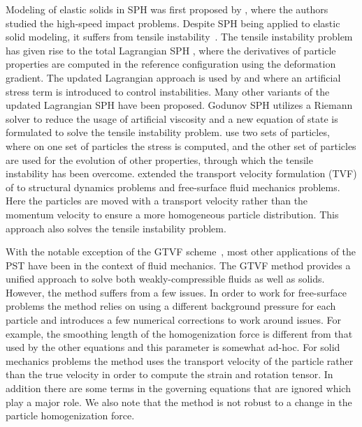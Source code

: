 Modeling of elastic solids in SPH was first proposed by
\textcite{libersky1991smooth}, where the authors studied the high-speed impact
problems. Despite SPH being applied to elastic solid modeling, it suffers from
tensile instability~\parencite{swegle1995smoothed}. The tensile instability problem
has given rise to the total Lagrangian SPH \parencite{belytschko2000unified,
  bonet2002alternative, vignjevic2006sph}, where the derivatives of particle
properties are computed in the reference configuration using the deformation
gradient. The updated Lagrangian approach is used by \textcite{gray2001sph} and
\textcite{monaghan2000sph} where an artificial stress term is introduced to control
instabilities. Many other variants of the updated Lagrangian SPH have been
proposed. Godunov SPH \parencite{sugiura2017extension} utilizes a Riemann solver to
reduce the usage of artificial viscosity and a new equation of state is
formulated to solve the tensile instability problem. \textcite{dyka1995approach} use
two sets of particles, where on one set of particles the stress is computed, and
the other set of particles are used for the evolution of other properties,
through which the tensile instability has been overcome.
\textcite{zhang2017generalized} extended the transport velocity formulation (TVF) of
\textcite{adami2013transport} to structural dynamics problems and free-surface fluid
mechanics problems. Here the particles are moved with a transport velocity
rather than the momentum velocity to ensure a more homogeneous particle
distribution. This approach also solves the tensile instability problem.

With the notable exception of the GTVF scheme~\parencite{zhang_hu_adams17}, most
other applications of the PST have been in the context of fluid mechanics. The
GTVF method provides a unified approach to solve both weakly-compressible fluids
as well as solids. However, the method suffers from a few issues. In order to
work for free-surface problems the method relies on using a different background
pressure for each particle and introduces a few numerical corrections to work
around issues. For example, the smoothing length of the homogenization force is
different from that used by the other equations and this parameter is somewhat
ad-hoc. For solid mechanics problems the method uses the transport velocity of
the particle rather than the true velocity in order to compute the strain and
rotation tensor. In addition there are some terms in the governing equations
that are ignored which play a major role. We also note that the method is not
robust to a change in the particle homogenization force.

